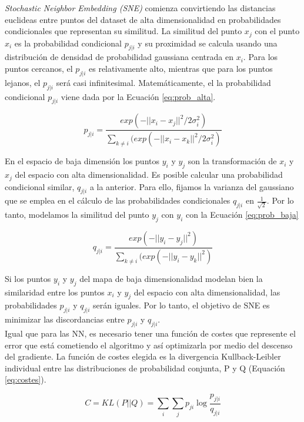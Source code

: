 \textit{Stochastic Neighbor Embedding (SNE)} comienza convirtiendo las distancias euclideas entre puntos del dataset de alta dimensionalidad en probabilidades condicionales que representan su similitud. La similitud del punto $x_j$ con el punto $x_i$ es la probabilidad condicional $p_{j|i}$ y su proximidad se calcula usando una distribución de densidad de probabilidad gaussiana centrada en $x_i$. Para los puntos cercanos, el $p_{j|i}$ es relativamente alto, mientras que para los puntos lejanos, el $p_{j|i}$ será casi infinitesimal. Matemáticamente, el la probabilidad condicional $p_{j|i}$ viene dada por la Ecuación \ref{eq:prob_alta}.

\begin{equation}
	p_{j|i} = \frac{exp(-||x_i-x_j||^2/2\sigma ^2_i)}{\sum_{k\neq i}( exp(-||x_i-x_k||^2/2\sigma ^2_i)}
	\label{eq:prob_alta}
\end{equation}
\vspace{4pt}

En el espacio de baja dimensión los puntos $y_i$ y $y_j$ son la transformación de $x_i$ y $x_j$ del espacio con alta dimensionalidad. Es posible calcular una probabilidad condicional similar, $q_{j|i}$ a la anterior. Para ello, fijamos la varianza del gaussiano que se emplea en el cálculo de las probabilidades condicionales $q_{j|i}$ en $\frac{1}{\sqrt{2}}$. Por lo tanto, modelamos la similitud del punto $y_j$ con $y_i$ con la Ecuación \ref{eq:prob_baja}

\begin{equation}
	q_{j|i} = \frac{exp(-||y_i-y_j||^2)}{\sum_{k\neq i}(exp(-||y_i-y_k||^2)}
	\label{eq:prob_baja}
\end{equation}
\vspace{4pt}

Si los puntos $y_i$ y $y_j$ del mapa de baja dimensionalidad modelan bien la similaridad entre los puntos $x_i$ y $y_j$ del espacio con alta dimensionalidad, las probabilidades $p_{j|i}$ y $q_{j|i}$ serán iguales. Por lo tanto, el objetivo de SNE es minimizar las discordancias entre $p_{j|i}$ y $q_{j|i}$.\\

Igual que para las NN, es necesario tener una función de costes que represente el error que está cometiendo el algoritmo y así optimizarla por medio del descenso del gradiente. La función de costes elegida es la divergencia Kullback-Leibler individual entre las distribuciones de probabilidad conjunta, P y Q (Equación \ref{eq:costes}).

\begin{equation}
	C = KL(P||Q) = \sum_{i}\sum_{j}p_{ji}\log\frac{p_{j|i}}{q_{j|i}}
	\label{eq:costes}
\end{equation}
\vspace{4pt}



